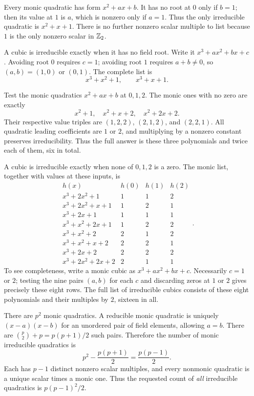 Every monic quadratic has form $x^2+ax+b$. It has no root at $0$ only if $b=1$; then its value at $1$ is $a$, which is nonzero only if $a=1$. Thus the only irreducible quadratic is $\boxed{x^2+x+1}$. There is no further nonzero scalar multiple to list because $1$ is the only nonzero scalar in $\mathbb{Z}_2$.

A cubic is irreducible exactly when it has no field root. Write it $x^3+ax^2+bx+c$. Avoiding root $0$ requires $c=1$; avoiding root $1$ requires $a+b\ne0$, so $(a,b)=(1,0)$ or $(0,1)$. The complete list is
\[\boxed{x^3+x^2+1,\qquad x^3+x+1}.
\]

Test the monic quadratics $x^2+ax+b$ at $0,1,2$. The monic ones with no zero are exactly
\[x^2+1,\quad x^2+x+2,\quad x^2+2x+2.
\]
Their respective value triples are $(1,2,2)$, $(2,1,2)$, and $(2,2,1)$. All quadratic leading coefficients are $1$ or $2$, and multiplying by a nonzero constant preserves irreducibility. Thus the full answer is these three polynomials and twice each of them, six in total.

A cubic is irreducible exactly when none of $0,1,2$ is a zero. The monic list, together with values at these inputs, is
\[
\begin{array}{l|ccc}h(x)&h(0)&h(1)&h(2)\\\hline
x^3+2x^2+1&1&1&2\\
x^3+2x^2+x+1&1&2&1\\
x^3+2x+1&1&1&1\\
x^3+x^2+2x+1&1&2&2\\
x^3+x^2+2&2&1&2\\
x^3+x^2+x+2&2&2&1\\
x^3+2x+2&2&2&2\\
x^3+2x^2+2x+2&2&1&1
\end{array}.
\]
To see completeness, write a monic cubic as $x^3+ax^2+bx+c$. Necessarily $c=1$ or $2$; testing the nine pairs $(a,b)$ for each $c$ and discarding zeros at $1$ or $2$ gives precisely these eight rows. The full list of irreducible cubics consists of these eight polynomials and their multiples by $2$, sixteen in all.

There are $p^2$ monic quadratics. A reducible monic quadratic is uniquely $(x-a)(x-b)$ for an unordered pair of field elements, allowing $a=b$. There are $\binom p2+p=p(p+1)/2$ such pairs. Therefore the number of monic irreducible quadratics is
\[p^2-\frac{p(p+1)}2=\frac{p(p-1)}2.
\]
Each has $p-1$ distinct nonzero scalar multiples, and every nonmonic quadratic is a unique scalar times a monic one. Thus the requested count of \emph{all} irreducible quadratics is $\boxed{p(p-1)^2/2}$.

